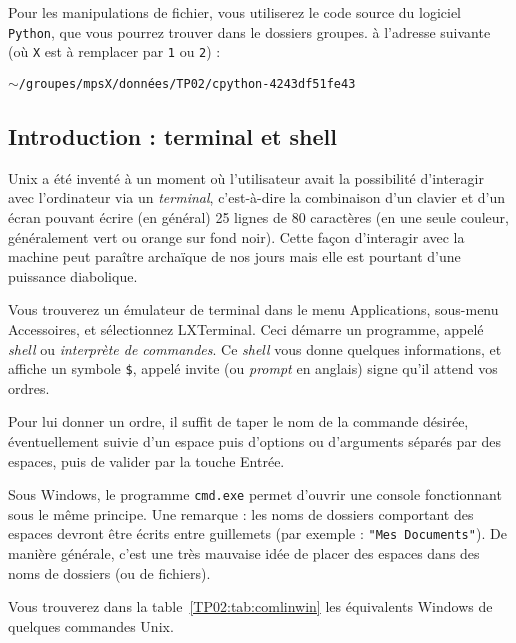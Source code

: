 Pour les manipulations de fichier, vous utiliserez le code source du logiciel
\texttt{Python}{}, que vous pourrez trouver dans le dossiers groupes. à l'adresse suivante (où \texttt{X} 
est à remplacer par \texttt{1} ou \texttt{2})  :
\begin{center}
  $\sim$\texttt{/groupes/mpsX/données/TP02/cpython-4243df51fe43}
\end{center}




\subsection{Introduction : terminal et shell} 

Unix a été inventé à un moment où l'utilisateur avait la possibilité
d'interagir avec l'ordinateur via un \emph{terminal}, c'est-à-dire la
combinaison d'un clavier et d'un écran pouvant écrire (en général) 25
lignes de 80 caractères (en une seule couleur, généralement vert ou
orange sur fond noir). Cette façon d'interagir avec la machine peut
paraître archaïque de nos jours mais elle est pourtant d'une puissance
diabolique.

Vous trouverez un émulateur de terminal dans
le menu \og{}Applications\fg{}, sous-menu \og{}Accessoires\fg{}, et
sélectionnez \og{}LXTerminal\fg{}. Ceci démarre un programme, appelé
\textit{shell}
ou \emph{interprète de commandes}. Ce \textit{shell} vous donne
quelques informations, et
affiche un symbole \texttt{\$}, appelé invite (ou \textit{prompt} en
anglais) signe qu'il attend vos ordres.

Pour lui donner un ordre, il suffit de taper le nom de la commande
désirée, éventuellement suivie d'un espace puis
d'options ou d'arguments séparés par des espaces, puis de valider par la touche
Entrée.

Sous Windows, le programme \texttt{cmd.exe} permet d'ouvrir une console fonctionnant sous le même principe.
Une remarque : les noms de dossiers comportant des espaces devront être écrits entre guillemets (par exemple : \texttt{"Mes Documents"}). 
De manière générale, c'est une très mauvaise idée de placer des espaces dans des noms de dossiers (ou de fichiers). 

Vous trouverez dans la table~\ref{TP02:tab:comlinwin} les équivalents Windows de quelques commandes Unix. 

